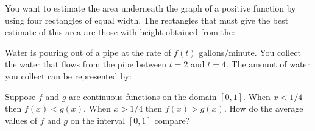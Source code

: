 \documentclass{ximera}
\newcommand{\recommendation}[1]{}
\newcommand{\GoodQuestions}[1]{}
\begin{document}


\begin{problem}
  \recommendation{Vic}
  \GoodQuestions{Subject: Areas, distances, Riemann sums 2P}
  
  You want to estimate the area underneath the graph of a positive
  function by using four rectangles of equal width. The rectangles
  that must give the best estimate of this area are those with height
  obtained from the:
  \begin{multipleChoice}
  \end{multipleChoice}
\end{problem}

\begin{problem}
  \recommendation{Vic}
  \GoodQuestions{Subject: Areas, distances, Riemann sums 7P}

  Water is pouring out of a pipe at the rate of $f(t)$
  gallons/minute.  You collect the water that flows from the pipe
  between $t=2$ and $t=4$.  The amount of water you collect can be
  represented by:
  \begin{multipleChoice}
  \end{multipleChoice}
\end{problem}


\begin{problem}
  Suppose $f$ and $g$ are continuous functions on the domain $[0,1]$.  When $x < 1/4$ then $f(x) < g(x)$.  When $x > 1/4$ then $f(x) > g(x)$.  How do the average values of $f$ and $g$ on the interval $[0,1]$ compare?
  \begin{multipleChoice}
  \end{multipleChoice}
\end{problem}
\end{document}
